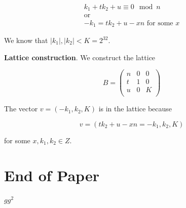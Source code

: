 \documentclass[a4paper,12pt]{report}
\begin{document}
\[
    \begin{array}{c}
        k_1 + tk_2 + u \equiv 0 \mod n \\
        \text{or} \\
        -k_1 = tk_2 + u - xn \text{   for some $x$}
    \end{array}
\]

We know that $|k_1|, |k_2| < K = 2^{32}$.

\vspace*{10px}

\textbf{Lattice construction}. We construct the lattice

\[
    B = 
    \begin{pmatrix}
        n & 0 & 0 \\
        t & 1 & 0 \\
        u & 0 & K \\
    \end{pmatrix}
\]

The vector $v = (-k_1, k_2, K)$ is in the lattice because

\[
    v = (tk_2 + u - xn = -k_1, k_2, K)
\]

for some $x, k_1, k_2 \in Z$.

\chapter*{End of Paper}

$gg^2$



\end{document}

